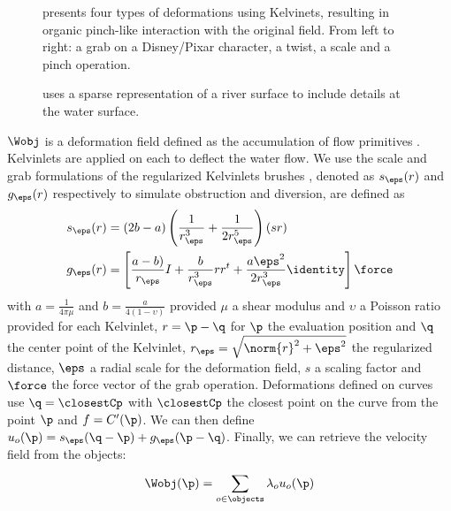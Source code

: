 \begin{figure}
    \caption{\cite{DeGoes2017} presents four types of deformations using Kelvinets, resulting in organic pinch-like interaction with the original field. From left to right: a grab on a \textcopyright Disney/Pixar character, a twist, a scale and a pinch operation. }
    \label{fig:env-obj_kelvinlets-demo}
\end{figure}

\begin{figure}
    \caption{\cite{Peytavie2019} uses a sparse representation of a river surface to include details at the water surface.}
    \label{fig:env-obj_peytavie-river-primitives}
\end{figure}

$\Wobj$ is a deformation field defined as the accumulation of flow primitives \cite{Wejchert1991}. Kelvinlets are applied on each  to deflect the water flow. We use the scale and grab formulations of the regularized Kelvinlets brushes \cite{DeGoes2017}, denoted as $s_\eps(r)$ and $g_\eps(r)$ respectively to simulate obstruction and diversion, are defined as
\begin{align*}
    s_\eps(r) &= (2b - a) \left( \frac{1}{r_\eps^3} + \frac{1}{2r_\eps^5} \right)(s r) \\
    g_\eps(r) &= \left[ \frac{a - b)}{r_\eps}I + \frac{b}{r_\eps^3} r r^t + 
\frac{a \eps^2}{2 r_\eps^3} \identity \right] \force
\end{align*}
with $a = \frac{1}{4 \pi \mu}$ and $b = \frac{a}{4 (1 - \upsilon)}$ provided $\mu$ a shear modulus and $\upsilon$ a Poisson ratio provided for each Kelvinlet, $r = \p - \q$ for $\p$ the evaluation position and $\q$ the center point of the Kelvinlet, $r_\eps = \sqrt{\norm{r}^2 + \eps^2}$ the regularized distance, $\eps$ a radial scale for the deformation field, $s$ a scaling factor and $\force$ the force vector of the grab operation.
Deformations defined on curves use $\q = \closestCp$ with $\closestCp$ the closest point on the curve from the point $\p$ and $f = C'(\p)$. We can then define $u_o(\p) = s_\eps(\q - \p) + g_\eps(\p - \q)$.
Finally, we can retrieve the velocity field from the objects:
\begin{align*}
    \Wobj(\p) = \sum_{o \in \objects}^{}{\lambda_o u_o(\p)}
\end{align*}


